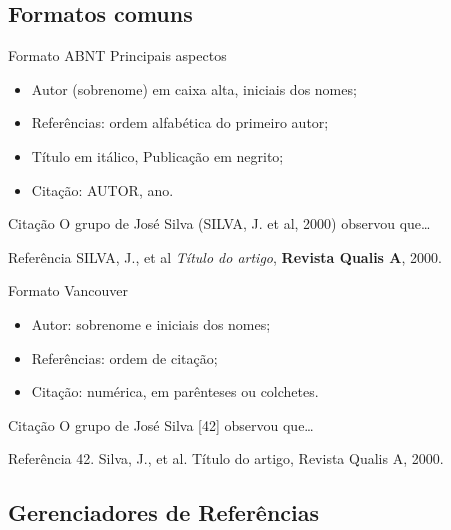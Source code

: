 \documentclass{beamer}
\begin{document}
\subsection{Formatos comuns}

\begin{frame}{Formato ABNT}
  Principais aspectos
  \begin{itemize}
    \footnotesize
  \item Autor (sobrenome) em caixa alta, iniciais dos nomes;
  \item Referências: ordem alfabética do primeiro autor;
  \item Título em itálico, Publicação em negrito;
  \item Citação: AUTOR, ano.
  \end{itemize}
  \bigskip
  \begin{exampleblock}{Citação}
    \footnotesize
    O grupo de José Silva (SILVA, J. et al, 2000) observou que\ldots
  \end{exampleblock}
  \begin{exampleblock}{Referência}
    \footnotesize
    SILVA, J., et al {\em Título do artigo}, {\bf Revista Qualis A},
    2000.
  \end{exampleblock}
\end{frame}

\begin{frame}{Formato Vancouver}
  \begin{itemize}
    \footnotesize
  \item Autor: sobrenome e iniciais dos nomes;
  \item Referências: ordem de citação;
  \item Citação: numérica, em parênteses ou colchetes.
  \end{itemize}
  \bigskip
  \begin{exampleblock}{Citação}
    \footnotesize
    O grupo de José Silva [42] observou que\ldots
  \end{exampleblock}
  \begin{exampleblock}{Referência}
    \footnotesize
    42. Silva, J., et al. Título do artigo, Revista Qualis A, 2000.
  \end{exampleblock}
\end{frame}

\subsection{Gerenciadores de Referências}
\end{document}
